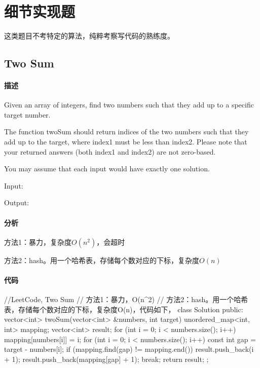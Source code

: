 \chapter{细节实现题}
这类题目不考特定的算法，纯粹考察写代码的熟练度。


\section{Two Sum} %
\label{sec:wordladder}


\subsubsection{描述}
Given an array of integers, find two numbers such that they add up to a specific target number.

The function twoSum should return indices of the two numbers such that they add up to the target, where index1 must be less than index2. Please note that your returned answers (both index1 and index2) are not zero-based.

You may assume that each input would have exactly one solution.

Input:  

Output: 


\subsubsection{分析}
方法1：暴力，复杂度$O(n^2)$，会超时

方法2：hash。用一个哈希表，存储每个数对应的下标，复杂度$O(n)$


\subsubsection{代码}
\begin{Code}
//LeetCode, Two Sum
// 方法1：暴力，O(n^2)
// 方法2：hash。用一个哈希表，存储每个数对应的下标，复杂度O(n)，代码如下，
class Solution {
public:
    vector<int> twoSum(vector<int> &numbers, int target) {
        unordered_map<int, int> mapping;
        vector<int> result;
        for (int i = 0; i < numbers.size(); i++) {
            mapping[numbers[i]] = i;
        }
        for (int i = 0; i < numbers.size(); i++) {
            const int gap = target - numbers[i];
            if (mapping.find(gap) != mapping.end()) {
                result.push_back(i + 1);
                result.push_back(mapping[gap] + 1);
                break;
            }
        }
        return result;
    }
};
\end{Code}


